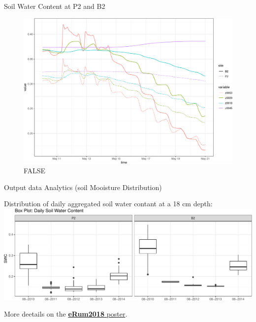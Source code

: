 \documentclass[ignorenonframetext,]{beamer}
\begin{document}
\begin{frame}{Soil Water Content at P2 and B2}

\begin{figure}
\centering
\includegraphics{presentation_files/figure-beamer/unnamed-chunk-11-1.pdf}
\caption{FALSE}
\end{figure}

\end{frame}

\begin{frame}{Output data Analytics (soil Mooisture Distribution)}

Distribution of daily aggregated soil water contant at a 18 cm depth:
\includegraphics{presentation_files/figure-beamer/unnamed-chunk-12-1.pdf}

More deetails on the
\href{https://github.com/ecor/geotopbricks_doc/blob/master/erum2018_poster/erum2018_poster_cordano_et_al.png}{\textbf{eRum2018}
poster}.

\end{frame}
\end{document}

